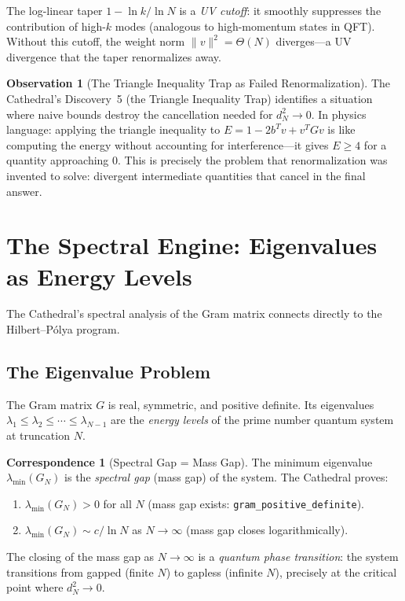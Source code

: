 \documentclass[11pt,a4paper]{article}
\theoremstyle{definition}
\newtheorem{correspondence}[definition]{Correspondence}
\newtheorem{observation}[definition]{Observation}
\newcommand{\lean}[1]{\texttt{#1}}
\begin{document}
The log-linear taper $1 - \ln k / \ln N$ is a \emph{UV cutoff}: it
smoothly suppresses the contribution of high-$k$ modes (analogous to
high-momentum states in QFT). Without this cutoff, the weight norm
$\|v\|^2 = \Theta(N)$ diverges---a UV divergence that the taper
renormalizes away.

\begin{observation}[The Triangle Inequality Trap as Failed Renormalization]
The Cathedral's Discovery~5 (the Triangle Inequality Trap) identifies
a situation where naive bounds destroy the cancellation needed for
$d_N^2 \to 0$. In physics language: applying the triangle inequality
to $E = 1 - 2b^Tv + v^TGv$ is like computing the energy without
accounting for interference---it gives $E \geq 4$ for a quantity
approaching $0$. This is precisely the problem that renormalization
was invented to solve: divergent intermediate quantities that cancel
in the final answer.
\end{observation}

\section{The Spectral Engine: Eigenvalues as Energy Levels}
\label{sec:spectral}

The Cathedral's spectral analysis of the Gram matrix connects directly
to the Hilbert--P\'olya program.

\subsection{The Eigenvalue Problem}

The Gram matrix $G$ is real, symmetric, and positive definite. Its
eigenvalues $\lambda_1 \leq \lambda_2 \leq \cdots \leq \lambda_{N-1}$
are the \emph{energy levels} of the prime number quantum system at
truncation $N$.

\begin{correspondence}[Spectral Gap = Mass Gap]
The minimum eigenvalue $\lambda_{\min}(G_N)$ is the \emph{spectral gap}
(mass gap) of the system. The Cathedral proves:
\begin{enumerate}
  \item $\lambda_{\min}(G_N) > 0$ for all $N$ (mass gap exists:
    \lean{gram\_positive\_definite}).
  \item $\lambda_{\min}(G_N) \sim c/\ln N$ as $N \to \infty$
    (mass gap closes logarithmically).
\end{enumerate}
The closing of the mass gap as $N \to \infty$ is a \emph{quantum
phase transition}: the system transitions from gapped (finite $N$)
to gapless (infinite $N$), precisely at the critical point where
$d_N^2 \to 0$.
\end{correspondence}
\end{document}
